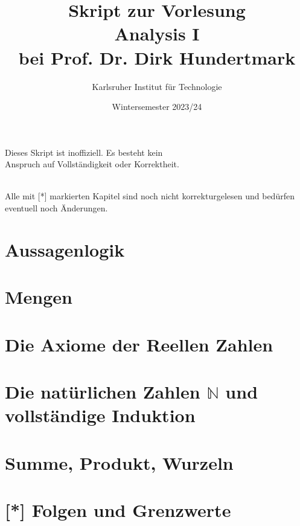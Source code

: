 \documentclass[11pt, twoside, a4paper]{article}
\theoremstyle{plain}
\newcommand{\naturalnumbers}{\mathbb{N}}
\begin{document}
    \title{\vspace{3cm} Skript zur Vorlesung\\Analysis I\\bei Prof. Dr. Dirk Hundertmark}
    \author{Karlsruher Institut für Technologie}
    \date{Wintersemester 2023/24}
    \maketitle
    \begin{center}
        Dieses Skript ist inoffiziell. Es besteht kein\\ Anspruch auf Vollständigkeit oder Korrektheit.
    \end{center}
    \thispagestyle{empty}
    \newpage

    \tableofcontents
    ~\\
    Alle mit [*] markierten Kapitel sind noch nicht korrekturgelesen und bedürfen eventuell noch Änderungen.
    \newpage


    \section{Aussagenlogik}
    


    \section{Mengen}
    


    \section{Die Axiome der Reellen Zahlen}
    


    \section{Die natürlichen Zahlen $\naturalnumbers$ und vollständige Induktion}
    


    \section{Summe, Produkt, Wurzeln}
    


    \section{[*] Folgen und Grenzwerte}
\end{document}
